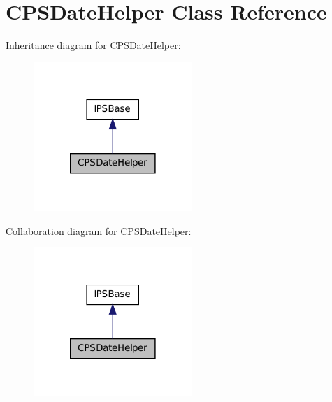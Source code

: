 \hypertarget{classCPSDateHelper}{
\section{CPSDateHelper Class Reference}
\label{classCPSDateHelper}
}


Inheritance diagram for CPSDateHelper:\nopagebreak
\begin{figure}[H]
\begin{center}
\leavevmode
\includegraphics[width=170pt]{classCPSDateHelper__inherit__graph}
\end{center}
\end{figure}


Collaboration diagram for CPSDateHelper:\nopagebreak
\begin{figure}[H]
\begin{center}
\leavevmode
\includegraphics[width=170pt]{classCPSDateHelper__coll__graph}
\end{center}
\end{figure}
